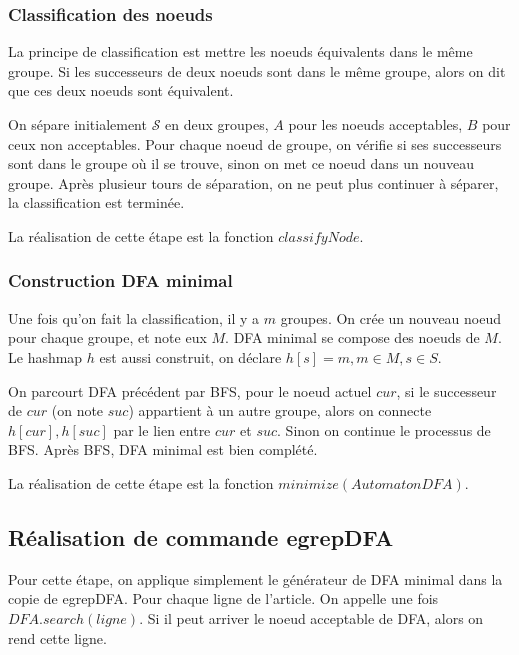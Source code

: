 \documentclass[14px]{article}
\begin{document}
\subsubsection{Classification des noeuds}
La principe de classification est mettre les noeuds équivalents dans le même groupe. Si les successeurs de deux noeuds sont dans le même groupe, alors on dit que ces deux noeuds sont équivalent.

On sépare initialement $\mathcal{S}$ en deux groupes, $A$ pour les noeuds acceptables, $B$ pour ceux non acceptables. Pour chaque noeud de groupe, on vérifie si ses successeurs sont dans le groupe où il se trouve, sinon on met ce noeud dans un nouveau groupe. Après plusieur tours de séparation, on ne peut plus continuer à séparer, la classification est terminée.

La réalisation de cette étape est la fonction $classifyNode$.

\subsubsection{Construction DFA minimal}
Une fois qu'on fait la classification, il y a $m$ groupes. On crée un nouveau noeud pour chaque groupe, et note eux $M$. DFA minimal se compose des noeuds de $M$. Le hashmap $h$ est aussi construit, on déclare $h[s] = m, m \in M, s \in S$.

On parcourt DFA précédent par BFS, pour le noeud actuel $cur$, si le successeur de $cur$ (on note $suc$) appartient à un autre groupe, alors on connecte $h[cur], h[suc]$ par le lien entre $cur$ et $suc$. Sinon on continue le processus de BFS. Après BFS, DFA minimal est bien complété. 

La réalisation de cette étape est la fonction $minimize(Automaton DFA)$.

\subsection{Réalisation de commande egrepDFA}
Pour cette étape, on applique simplement le générateur de DFA minimal dans la copie de egrepDFA. Pour chaque ligne de l'article. On appelle une fois $DFA.search(ligne)$. Si il peut arriver le noeud acceptable de DFA, alors on rend cette ligne.
\end{document}
